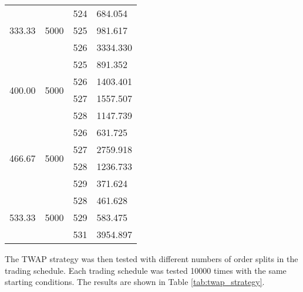 \begin{table}[htbp]
\begin{center}
\begin{tabular}{l|l|l|l}
\hline                        
\multirow{3}{*}{333.33} & \multirow{3}{*}{5000} & 524   & 684.054  \\
                        &                          & 525   & 981.617  \\
                        &                          & 526   & 3334.330 \\
\hline                        
\multirow{4}{*}{400.00} & \multirow{4}{*}{5000} & 525   & 891.352  \\
                        &                          & 526   & 1403.401 \\
                        &                          & 527   & 1557.507 \\
                        &                          & 528   & 1147.739 \\
\hline                        
\multirow{4}{*}{466.67} & \multirow{4}{*}{5000} & 526   & 631.725  \\
                        &                          & 527   & 2759.918 \\
                        &                          & 528   & 1236.733 \\
                        &                          & 529   & 371.624  \\
\hline                        
\multirow{3}{*}{533.33} & \multirow{3}{*}{5000} & 528   & 461.628  \\
                        &                          & 529   & 583.475  \\
                        &                          & 531   & 3954.897
\end{tabular}
\end{center}
\end{table}

The TWAP strategy was then tested with different numbers of order splits in the trading schedule. Each trading schedule was tested 10000 times with the same starting conditions. The results are shown in Table \ref{tab:twap_strategy}.

